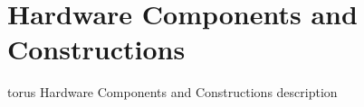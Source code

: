 \section{Hardware Components and Constructions}

torus Hardware Components and Constructions description

